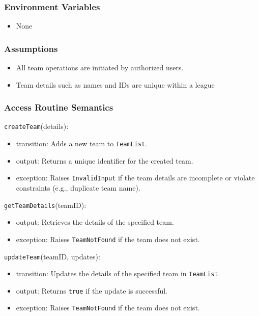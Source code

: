 \documentclass[12pt, titlepage]{article}
\begin{document}
\subsubsection{Environment Variables}
\begin{itemize}
  \item None
\end{itemize}

\subsubsection{Assumptions}
\begin{itemize}
  \item All team operations are initiated by authorized users.
  \item Team details such as names and IDs are unique within a league
\end{itemize}

\subsubsection{Access Routine Semantics}

\noindent \texttt{createTeam}(details):
\begin{itemize}
  \item transition: Adds a new team to \texttt{teamList}.
  \item output: Returns a unique identifier for the created team.
  \item exception: Raises \texttt{InvalidInput} if the team details are incomplete or violate constraints (e.g., duplicate team name).
\end{itemize}

\noindent \texttt{getTeamDetails}(teamID):
\begin{itemize}
  \item output: Retrieves the details of the specified team.
  \item exception: Raises \texttt{TeamNotFound} if the team does not exist.
\end{itemize}

\noindent \texttt{updateTeam}(teamID, updates):
\begin{itemize}
  \item transition: Updates the details of the specified team in \texttt{teamList}.
  \item output: Returns \texttt{true} if the update is successful.
  \item exception: Raises \texttt{TeamNotFound} if the team does not exist.
\end{itemize}
\end{document}
